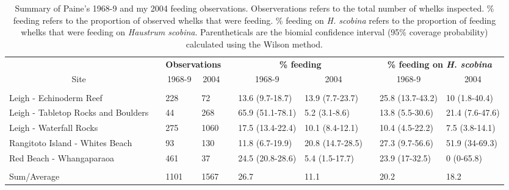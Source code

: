 \begin{table}[!tbp]
\caption{Summary of Paine's 1968-9 and my 2004 feeding observations.  Observerations refers to the total number of whelks inspected. \% feeding refers to the proportion of observed whelks that were feeding. \% feeding on \emph{H. scobina} refers to the proportion of feeding whelks that were feeding on \emph{Haustrum scobina}.  Parentheticals are the biomial confidence interval (95\% coverage probability) calculated using the Wilson method.\label{tab:summ}} 
{\centering
\begin{tabular}{lcllcllcll}
\hline
\multicolumn{1}{c}{\bfseries }&\multicolumn{1}{c}{\bfseries }&\multicolumn{2}{c}{\bfseries Observations}&\multicolumn{1}{c}{\bfseries }&\multicolumn{2}{c}{\bfseries \% feeding}&\multicolumn{1}{c}{\bfseries }&\multicolumn{2}{c}{\bfseries \% feeding on \emph{H. scobina}}\tabularnewline
\cline{3-4} \cline{6-7} \cline{9-10}
\multicolumn{1}{c}{Site}&\multicolumn{1}{c}{}&\multicolumn{1}{c}{1968-9}&\multicolumn{1}{c}{2004}&\multicolumn{1}{c}{}&\multicolumn{1}{c}{1968-9}&\multicolumn{1}{c}{2004}&\multicolumn{1}{c}{}&\multicolumn{1}{c}{1968-9}&\multicolumn{1}{c}{2004}\tabularnewline
\hline
&&&&&&&&&\tabularnewline
Leigh - Echinoderm Reef&&228&72&&13.6 (9.7-18.7)&13.9 (7.7-23.7)&&25.8 (13.7-43.2)&10 (1.8-40.4)\tabularnewline
Leigh - Tabletop Rocks and Boulders&&44&268&&65.9 (51.1-78.1)&5.2 (3.1-8.6)&&13.8 (5.5-30.6)&21.4 (7.6-47.6)\tabularnewline
Leigh - Waterfall Rocks&&275&1060&&17.5 (13.4-22.4)&10.1 (8.4-12.1)&&10.4 (4.5-22.2)&7.5 (3.8-14.1)\tabularnewline
Rangitoto Island - Whites Beach&&93&130&&11.8 (6.7-19.9)&20.8 (14.7-28.5)&&27.3 (9.7-56.6)&51.9 (34-69.3)\tabularnewline
Red Beach - Whangaparaoa&&461&37&&24.5 (20.8-28.6)&5.4 (1.5-17.7)&&23.9 (17-32.5)&0 (0-65.8)\tabularnewline
\hline
&&&&&&&&&\tabularnewline
Sum/Average&&1101&1567&&26.7&11.1&&20.2&18.2\tabularnewline
\hline
\end{tabular}}
\end{table}
